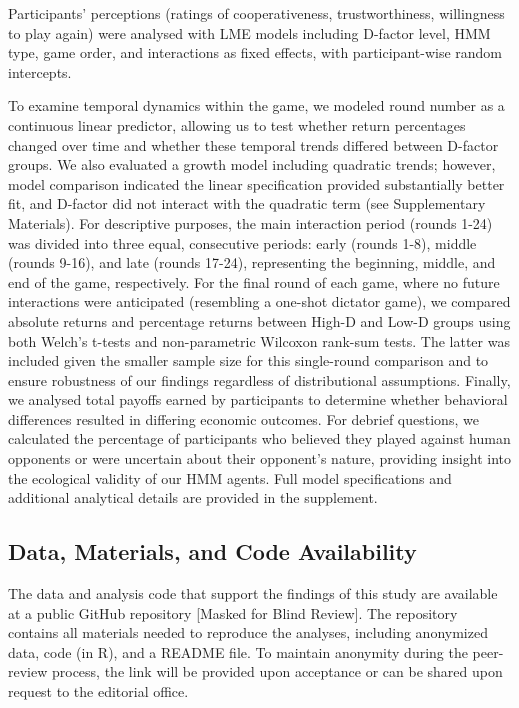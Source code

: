\documentclass[
]{article}
\begin{document}
Participants' perceptions (ratings of cooperativeness, trustworthiness, willingness to play again) were analysed with LME models including D-factor level, HMM type, game order, and interactions as fixed effects, with participant-wise random intercepts.

To examine temporal dynamics within the game, we modeled round number as a continuous linear predictor, allowing us to test whether return percentages changed over time and whether these temporal trends differed between D-factor groups.
We also evaluated a growth model including quadratic trends; however, model comparison indicated the linear specification provided substantially better fit, and D-factor did not interact with the quadratic term (see Supplementary Materials).
For descriptive purposes, the main interaction period (rounds 1-24) was divided into three equal, consecutive periods: early (rounds 1-8), middle (rounds 9-16), and late (rounds 17-24), representing the beginning, middle, and end of the game, respectively.
For the final round of each game, where no future interactions were anticipated (resembling a one-shot dictator game), we compared absolute returns and percentage returns between High-D and Low-D groups using both Welch's t-tests and non-parametric Wilcoxon rank-sum tests.
The latter was included given the smaller sample size for this single-round comparison and to ensure robustness of our findings regardless of distributional assumptions.
Finally, we analysed total payoffs earned by participants to determine whether behavioral differences resulted in differing economic outcomes.
For debrief questions, we calculated the percentage of participants who believed they played against human opponents or were uncertain about their opponent's nature, providing insight into the ecological validity of our HMM agents.
Full model specifications and additional analytical details are provided in the supplement.

\subsection{Data, Materials, and Code Availability}\label{data-materials-and-code-availability}

The data and analysis code that support the findings of this study are available at a public GitHub repository {[}Masked for Blind Review{]}.
The repository contains all materials needed to reproduce the analyses, including anonymized data, code (in R), and a README file.
To maintain anonymity during the peer-review process, the link will be provided upon acceptance or can be shared upon request to the editorial office.
\end{document}
